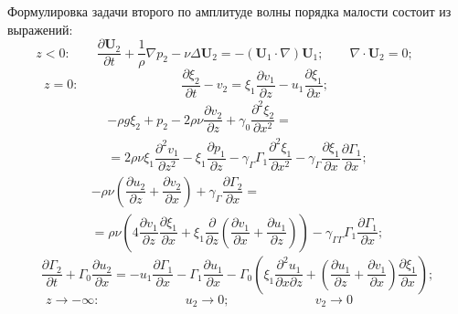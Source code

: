 Формулировка задачи второго по амплитуде волны порядка малости состоит из выражений:
\begin{equation}
z<0: \qquad  \dfrac{\partial \mathbf{U}_{2}}{\partial t}+\dfrac{1}{\rho} \nabla p_{2}-\nu \Delta \mathbf{U}_{2}=-\left( \mathbf{U}_{1}\cdot \nabla \right) \mathbf{U}_{1}; \qquad \nabla \cdot \mathbf{U}_{2}=0; \qquad  \label{NSPAV2}
\end{equation}
\begin{equation}
z=0: \mspace{144mu} \dfrac{\partial \xi_{2}}{\partial t}-v_{2}=\xi_{1} \dfrac{\partial v_{1}}{\partial z}-u_{1} \dfrac{\partial \xi_{1}}{\partial x};\mspace{144mu}
 \label{GU1PAV2}
\end{equation}
\begin{multline}
-\rho g \xi_{2}+p_{2}-2 \rho \nu \dfrac{\partial v_{2}}{\partial z}+\gamma_{0} \dfrac{\partial^{2}\xi_{2}}{\partial x^{2}}=\\
=2 \rho \nu \xi_{1} \dfrac{\partial^{2} v_{1}}{\partial z^{2}}-\xi_{1} \dfrac{\partial p_{1}}{\partial z}-\gamma_{\Gamma} \Gamma_{1} \dfrac{\partial^{2}\xi_{1}}{\partial x^{2}}-\gamma_{\Gamma} \dfrac{\partial \xi_{1}}{\partial x} \dfrac{\partial \Gamma_{1}}{\partial x};
\label{GU2PAV2}
\end{multline}
\begin{multline}
-\rho \nu \left( \dfrac{\partial u_{2}}{\partial z} +\dfrac{\partial v_{2}}{\partial x} \right) +\gamma_{\Gamma} \dfrac{\partial \Gamma_{2}}{\partial x}= \\
=\rho \nu \left( 4 \dfrac{\partial v_{1}}{\partial z} \dfrac{\partial \xi_{1}}{\partial x}+\xi_{1} \dfrac{\partial}{\partial z} \left( \dfrac{\partial v_{1}}{\partial x} + \dfrac{\partial u_{1}}{\partial z} \right) \right) - \gamma_{\Gamma \Gamma} \Gamma_{1} \dfrac{\partial \Gamma_{1}}{\partial x}; 
 \label{GU3PAV2}
\end{multline}
\begin{equation}
 \dfrac{\partial \Gamma_{2}}{\partial t}+\Gamma_{0} \dfrac{\partial u_{2}}{\partial x}=-u_{1}\dfrac{\partial \Gamma_{1}}{\partial x}- \Gamma_{1}\dfrac{\partial u_{1}}{\partial x} - \Gamma_{0} \left( \xi_{1} \dfrac{\partial^{2} u_{1}}{\partial x \partial z}+\left( \dfrac{\partial u_{1}}{\partial z}+\dfrac{\partial v_{1}}{\partial x} \right) \dfrac{\partial \xi_{1}}{\partial x} \right); 
  \label{GU4PAV2}
\end{equation}
\begin{equation}
z \rightarrow - \infty:\mspace{120mu} u_{2} \rightarrow 0; \mspace{120mu} v_{2} \rightarrow 0 \mspace{108mu} \label{BeskUslPAV2}
\end{equation}

